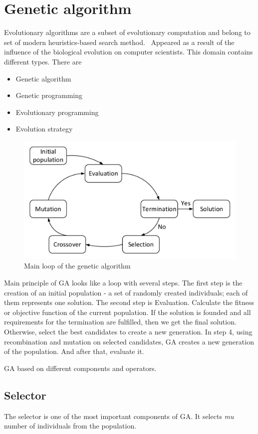 \section{Genetic algorithm}
\label{sec:GeneticAlgorithm}
Evolutionary algorithms are a subset of evolutionary computation and belong to set of modern heuristics-based search method.~\cite{vikhar16}
Appeared as a result of the influence of the biological evolution on computer scientists. This domain contains different types.
There are
\begin{itemize}
	\item Genetic algorithm 
	\item Genetic programming
	\item Evolutionary programming
	\item Evolution strategy
\end{itemize}

\begin{figure}
	\centering
	\includegraphics[width=\textwidth]{images/GeneticLoop}
	\caption{Main loop of the genetic algorithm}
	\label{fig:GeneticLoop}
\end{figure}
Main principle of GA looks like a loop with several steps.
The first step is the creation of an initial population - a set of randomly created individuals; each of them represents one solution. 
The second step is Evaluation. Calculate the fitness or objective function of the current population.
If the solution is founded and all requirements for the termination are fulfilled, then we get the final solution. Otherwise, select the best candidates to create a new generation.
In step 4, using recombination and mutation on selected candidates, GA creates a new generation of the population. And after that, evaluate it.

GA based on different components and operators.
\subsection{Selector}
The selector is one of the most important components of GA. It selects \textit{mu} number of individuals from the population.

